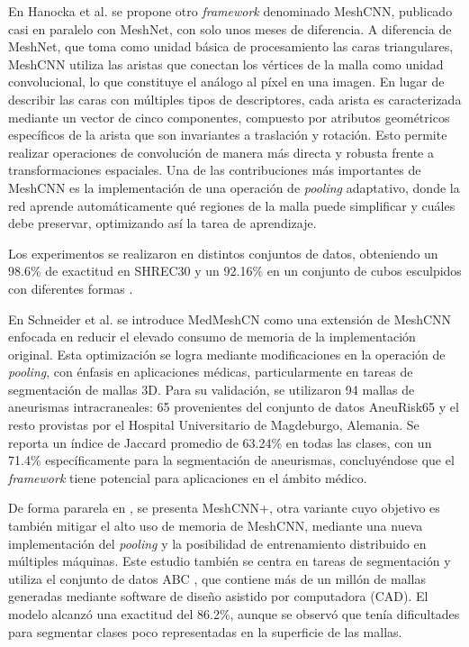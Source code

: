 En Hanocka et al. \cite{hanocka2019meshcnn} se propone otro \textit{framework} denominado MeshCNN, publicado casi en paralelo con MeshNet, con solo unos meses de diferencia. A diferencia de MeshNet, que toma como unidad básica de procesamiento las caras triangulares, MeshCNN utiliza las aristas que conectan los vértices de la malla como unidad convolucional, lo que constituye el análogo al píxel en una imagen. En lugar de describir las caras con múltiples tipos de descriptores, cada arista es caracterizada mediante un vector de cinco componentes, compuesto por atributos geométricos específicos de la arista que son invariantes a traslación y rotación. Esto permite realizar operaciones de convolución de manera más directa y robusta frente a transformaciones espaciales. Una de las contribuciones más importantes de MeshCNN es la implementación de una operación de \textit{pooling} adaptativo, donde la red aprende automáticamente qué regiones de la malla puede simplificar y cuáles debe preservar, optimizando así la tarea de aprendizaje.

Los experimentos se realizaron en distintos conjuntos de datos, obteniendo un 98.6\% de exactitud en SHREC30 \cite{lian2011shape} y un 92.16\% en un conjunto de cubos esculpidos con diferentes formas \cite{latecki2000shape}.

En Schneider et al. \cite{schneider_medmeshcnn_2021} se introduce MedMeshCN como una extensión de MeshCNN enfocada en reducir el elevado consumo de memoria de la implementación original. Esta optimización se logra mediante modificaciones en la operación de \textit{pooling}, con énfasis en aplicaciones médicas, particularmente en tareas de segmentación de mallas 3D. Para su validación, se utilizaron 94 mallas de aneurismas intracraneales: 65 provenientes del conjunto de datos AneuRisk65 \cite{sangalli2014aneurisk65} y el resto provistas por el Hospital Universitario de Magdeburgo, Alemania. Se reporta un índice de Jaccard promedio de 63.24\% en todas las clases, con un 71.4\% específicamente para la segmentación de aneurismas, concluyéndose que el \textit{framework} tiene potencial para aplicaciones en el ámbito médico.

De forma pararela en \cite{mandado_surface_2021}, se presenta MeshCNN+, otra variante cuyo objetivo es también mitigar el alto uso de memoria de MeshCNN, mediante una nueva implementación del \textit{pooling} y la posibilidad de entrenamiento distribuido en múltiples máquinas. Este estudio también se centra en tareas de segmentación y utiliza el conjunto de datos ABC \cite{Koch_2019_CVPR}, que contiene más de un millón de mallas generadas mediante software de diseño asistido por computadora (CAD). El modelo alcanzó una exactitud del 86.2\%, aunque se observó que tenía dificultades para segmentar clases poco representadas en la superficie de las mallas.

